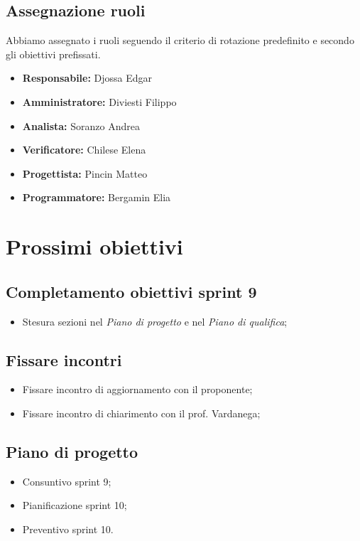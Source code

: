\subsection{Assegnazione ruoli}
Abbiamo assegnato i ruoli seguendo il criterio di rotazione predefinito e secondo gli obiettivi prefissati.
\begin{itemize}
    \item \textbf{Responsabile:} Djossa Edgar
    \item \textbf{Amministratore:} Diviesti Filippo
    \item \textbf{Analista:} Soranzo Andrea
    \item \textbf{Verificatore:} Chilese Elena
    \item \textbf{Progettista:} Pincin Matteo
    \item \textbf{Programmatore:} Bergamin Elia
\end{itemize}

\section{Prossimi obiettivi}
\subsection{Completamento obiettivi sprint 9}
\begin{itemize}
    \item Stesura sezioni nel \textit{Piano di progetto} e nel \textit{Piano di qualifica};
\end{itemize}

\subsection{Fissare incontri}
\begin{itemize}
    \item Fissare incontro di aggiornamento con il proponente;
    \item Fissare incontro di chiarimento con il prof. Vardanega; 
\end{itemize}

\subsection{Piano di progetto}
\begin{itemize}
    \item Consuntivo sprint 9;
    \item Pianificazione sprint 10;
    \item Preventivo sprint 10.
\end{itemize}


